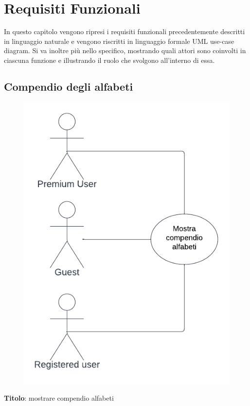 \section{Requisiti Funzionali}
In questo capitolo vengono ripresi i requisiti funzionali precedentemente descritti in linguaggio naturale e vengono riscritti in linguaggio formale UML use-case diagram. Si va inoltre più nello specifico, mostrando quali attori sono coinvolti in ciascuna funzione e illustrando il ruolo che svolgono all'interno di essa.

\subsection{Compendio degli alfabeti} \label{req_compendio_alfabeti}
\begin{figure}[!h]
\centering
\includegraphics[scale=0.35]{images/use_case_compendio.png}
\end{figure}
\noindent
\textbf{Titolo}: mostrare compendio alfabeti \\
